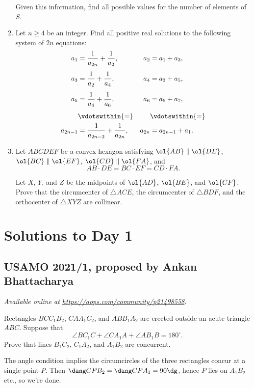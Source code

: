 \documentclass[11pt]{scrartcl}
\begin{document}
\begin{enumerate}[\bfseries 1.]
Given this information, find all possible values for the
number of elements of $S$.

\item %
Let $n \ge 4$ be an integer.
Find all positive real solutions to the following
system of $2n$ equations:
\begin{align*}
  a_1 &= \frac{1}{a_{2n}} + \frac{1}{a_{2}}, & a_2 &= a_1 + a_3, \\[1ex]
  a_3 &= \frac{1}{a_{2}} + \frac{1}{a_{4}}, & a_4 &= a_3 + a_5, \\[1ex]
  a_5 &= \frac{1}{a_{4}} + \frac{1}{a_{6}}, & a_6 &= a_5 + a_7, \\[1ex]
  &\vdotswithin{=} &&\vdotswithin{=} \\
  a_{2n-1} &= \frac{1}{a_{2n-2}} + \frac{1}{a_{2n}}, & a_{2n} &= a_{2n-1} + a_1.
\end{align*}

\item %
Let $ABCDEF$ be a convex hexagon satisfying
$\ol{AB} \parallel \ol{DE}$,
$\ol{BC} \parallel \ol{EF}$,
$\ol{CD} \parallel \ol{FA}$, and
\[ AB \cdot DE = BC \cdot EF = CD \cdot FA. \]

Let $X$, $Y$, and $Z$ be the midpoints
of $\ol{AD}$, $\ol{BE}$, and $\ol{CF}$.
Prove that
the circumcenter of $\triangle ACE$,
the circumcenter of $\triangle BDF$, and
the orthocenter of $\triangle XYZ$ are collinear.

\end{enumerate}
\pagebreak

\section{Solutions to Day 1}
\subsection{USAMO 2021/1, proposed by Ankan Bhattacharya}
\textsl{Available online at \url{https://aops.com/community/p21498558}.}
\begin{mdframed}[style=mdpurplebox,frametitle={Problem statement}]
Rectangles $BCC_1B_2$, $CAA_1C_2$, and $ABB_1A_2$ are erected
outside an acute triangle $ABC$. Suppose that
\[ \angle BC_1C + \angle CA_1A + \angle AB_1B = 180^\circ. \]
Prove that lines $B_1C_2$, $C_1A_2$, and $A_1B_2$ are concurrent.
\end{mdframed}
The angle condition implies the circumcircles of the three
rectangles concur at a single point $P$.
Then $\dang C P B_2 = \dang C P A_1 = 90\dg$,
hence $P$ lies on $A_1 B_2$ etc., so we're done.
\end{document}
